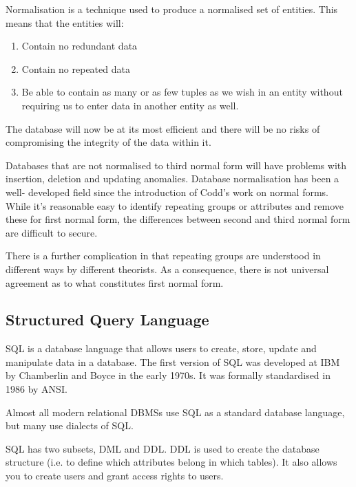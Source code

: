 \documentclass{article}
\begin{document}
Normalisation is a technique used to produce a normalised set of entities. This
means that the entities will:\begin{enumerate}

    \item Contain no redundant data

    \item Contain no repeated data

    \item Be able to contain as many or as few tuples as we wish in an entity
        without requiring us to enter data in another entity as well.

\end{enumerate} The database will now be at its most efficient and there will be
no risks of compromising the integrity of the data within it.

Databases that are not normalised to third normal form will have problems with
insertion, deletion and updating anomalies. Database normalisation has been a
well- developed field since the introduction of Codd's work on normal forms.
While it's reasonable easy to identify repeating groups or attributes and remove
these for first normal form, the differences between second and third normal
form are difficult to secure.

There is a further complication in that repeating groups are understood in
different ways by different theorists. As a consequence, there is not universal
agreement as to what constitutes first normal form.

\subsection{Structured Query Language}

SQL is a database language that allows users to create, store, update and
manipulate data in a database. The first version of SQL was developed at IBM by
Chamberlin and Boyce in the early 1970s. It was formally standardised in 1986 by
ANSI.

Almost all modern relational DBMSs use SQL as a standard database language, but
many use dialects of SQL.

SQL has two subsets, DML and DDL. DDL is used to create the
database structure (i.e. to define which attributes belong in which tables). It
also allows you to create users and grant access rights to users.
\end{document}
